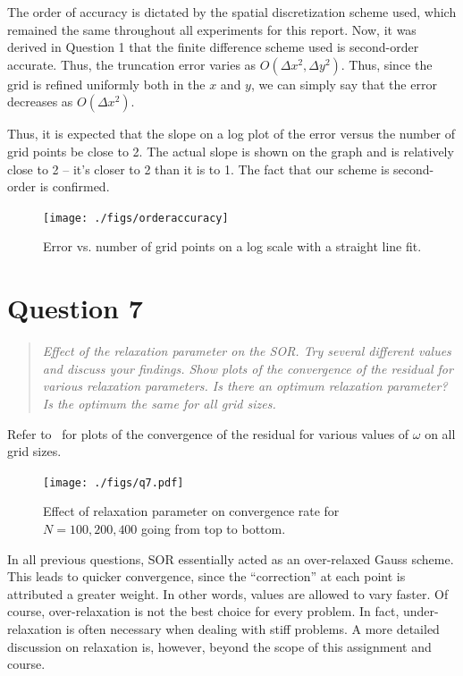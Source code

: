 \documentclass{SelimArticle}
\begin{document}
The order of accuracy is dictated by the spatial discretization scheme used, which remained the same
throughout all experiments for this report. Now, it was derived in Question 1 that the finite difference
scheme used is second-order accurate. Thus, the truncation error varies as $O(\Delta x^2, \Delta y^2)$.
Thus, since the grid is refined uniformly both in the $x$ and $y$, we can simply say
that the error decreases as $O(\Delta x^2)$.

Thus, it is expected that the slope on a log plot of the error versus the number of grid points be close to
2. The actual slope is shown on the graph and is relatively close to 2 -- it's closer to 2 than it is to 1.
The fact that our scheme is second-order is confirmed.
\begin{figure}[H]
    \centering
    \texttt{[image: ./figs/orderaccuracy]}
    \caption{Error vs. number of grid points on a log scale with a straight line fit.}\label{fig:orderaccuracy}
\end{figure}



\newpage
\section{Question 7}
\begin{quote}
    \textit{Effect of the relaxation parameter on the SOR. Try several different values and discuss
    your findings. Show plots of the convergence of the residual for various relaxation
    parameters. Is there an optimum relaxation parameter? Is the optimum the same for
    all grid sizes.}
\end{quote}
Refer to~ for plots of the convergence of the residual for various values of $\omega$
on all grid sizes.
\begin{figure}
    \centering
    \texttt{[image: ./figs/q7.pdf]}
    \caption{Effect of relaxation parameter on convergence rate for $N = 100, 200, 400$ going from top to bottom.}
    \label{fig:q7}
\end{figure}

In all previous questions, SOR essentially acted as an over-relaxed Gauss scheme. This leads to quicker
convergence, since the ``correction'' at each point is attributed a greater weight.
In other words, values are allowed to vary faster. Of course, over-relaxation is not the
best choice for every problem. In fact, under-relaxation is often necessary when dealing with stiff
problems. A more detailed discussion on relaxation is, however, beyond the scope of this assignment and course.
\end{document}
